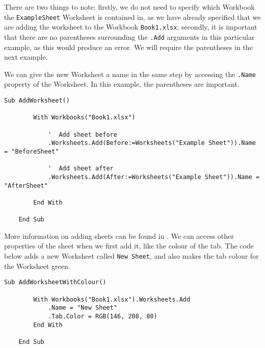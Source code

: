 \documentclass[11pt]{article}%
\begin{document}
There are two things to note: firstly, we do not need to specify which Workbook the \texttt{ExampleSheet} Worksheet is contained in, as we have already specified that we are adding the worksheet to the Workbook \texttt{Book1.xlsx}; secondly, it is important that there are no parentheses surrounding the \texttt{.Add} arguments in this particular example, as this would produce an error. We will require the parentheses in the next example.

We can give the new Worksheet a name in the same step by accessing the \texttt{.Name} property of the Worksheet. In this example, the parentheses are important.\\

\begin{lstlisting}[style=A]
    Sub AddWorksheet()

        With Workbooks("Book1.xlsx")

            '  Add sheet before
            .Worksheets.Add(Before:=Worksheets("Example Sheet")).Name = "BeforeSheet"

            '  Add sheet after
            .Worksheets.Add(After:=Worksheets("Example Sheet")).Name = "AfterSheet"

        End With

    End Sub
\end{lstlisting}

More information on adding sheets can be found in \cite{WorksheetsAdd}. We can access other properties of the sheet when we first add it, like the colour of the tab. The code below adds a new Worksheet called \texttt{New Sheet}, and also makes the tab colour for the Worksheet green.\\

\begin{lstlisting}[style=A]
    Sub AddWorksheetWithColour()

        With Workbooks("Book1.xlsx").Worksheets.Add
            .Name = "New Sheet"
            .Tab.Color = RGB(146, 208, 80)
        End With

    End Sub
\end{lstlisting}



\end{document}
